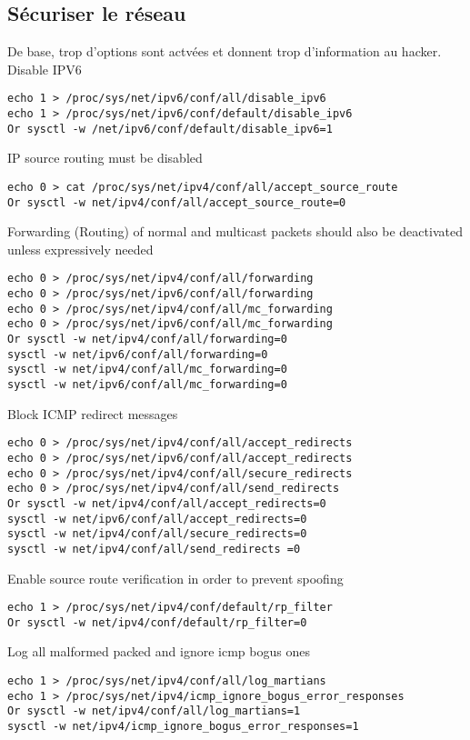 \subsection{Sécuriser le réseau}
De base, trop d'options sont actvées et donnent trop d'information au hacker. \\
Disable IPV6
\begin{lstlisting}[style=bash]
echo 1 > /proc/sys/net/ipv6/conf/all/disable_ipv6
echo 1 > /proc/sys/net/ipv6/conf/default/disable_ipv6
Or sysctl -w /net/ipv6/conf/default/disable_ipv6=1
\end{lstlisting}
IP source routing must be disabled
\begin{lstlisting}[style=bash]
echo 0 > cat /proc/sys/net/ipv4/conf/all/accept_source_route
Or sysctl -w net/ipv4/conf/all/accept_source_route=0
\end{lstlisting}
Forwarding (Routing) of normal and multicast packets should also be deactivated unless 
expressively needed
\begin{lstlisting}[style=bash]
echo 0 > /proc/sys/net/ipv4/conf/all/forwarding
echo 0 > /proc/sys/net/ipv6/conf/all/forwarding
echo 0 > /proc/sys/net/ipv4/conf/all/mc_forwarding
echo 0 > /proc/sys/net/ipv6/conf/all/mc_forwarding
Or sysctl -w net/ipv4/conf/all/forwarding=0
sysctl -w net/ipv6/conf/all/forwarding=0
sysctl -w net/ipv4/conf/all/mc_forwarding=0
sysctl -w net/ipv6/conf/all/mc_forwarding=0
\end{lstlisting}
Block ICMP redirect messages
\begin{lstlisting}[style=bash]
echo 0 > /proc/sys/net/ipv4/conf/all/accept_redirects
echo 0 > /proc/sys/net/ipv6/conf/all/accept_redirects
echo 0 > /proc/sys/net/ipv4/conf/all/secure_redirects
echo 0 > /proc/sys/net/ipv4/conf/all/send_redirects
Or sysctl -w net/ipv4/conf/all/accept_redirects=0
sysctl -w net/ipv6/conf/all/accept_redirects=0
sysctl -w net/ipv4/conf/all/secure_redirects=0
sysctl -w net/ipv4/conf/all/send_redirects =0
\end{lstlisting}
Enable source route verification in order to prevent spoofing
\begin{lstlisting}[style=bash]
echo 1 > /proc/sys/net/ipv4/conf/default/rp_filter
Or sysctl -w net/ipv4/conf/default/rp_filter=0
\end{lstlisting}
Log all malformed packed and ignore icmp bogus ones
\begin{lstlisting}[style=bash]
echo 1 > /proc/sys/net/ipv4/conf/all/log_martians
echo 1 > /proc/sys/net/ipv4/icmp_ignore_bogus_error_responses
Or sysctl -w net/ipv4/conf/all/log_martians=1
sysctl -w net/ipv4/icmp_ignore_bogus_error_responses=1
\end{lstlisting}
